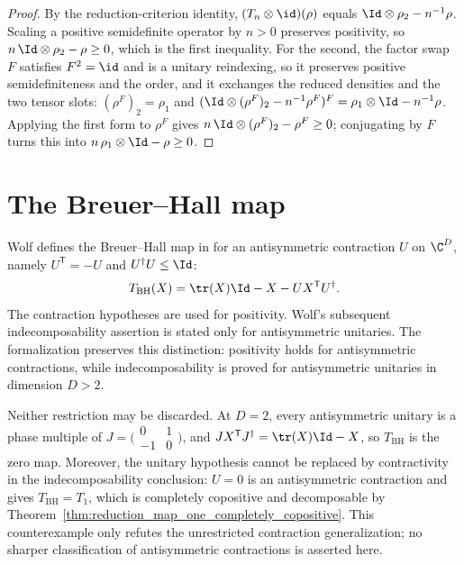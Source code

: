 \begin{proof}
    \leanok
    By the reduction-criterion identity, $(T_n\otimes\id)(\rho)$ equals
    $\Id\otimes\rho_2-n^{-1}\rho$. Scaling a positive semidefinite operator by
    $n>0$ preserves positivity, so $n\,\Id\otimes\rho_2-\rho\ge0$, which is the
    first inequality. For the second, the factor swap $F$ satisfies $F^2=\id$
    and is a unitary reindexing, so it preserves positive semidefiniteness and
    the order, and it exchanges the reduced densities and the two tensor slots:
    $(\rho^{F})_2=\rho_1$ and
    $(\Id\otimes(\rho^{F})_2-n^{-1}\rho^{F})^{F}
        =\rho_1\otimes\Id-n^{-1}\rho$.
    Applying the first form to $\rho^{F}$ gives
    $n\,\Id\otimes(\rho^{F})_2-\rho^{F}\ge0$; conjugating by $F$ turns this into
    $n\,\rho_1\otimes\Id-\rho\ge0$.
\end{proof}

\section{The Breuer--Hall map}

Wolf defines the Breuer--Hall map in
\cite[Chapter~3, Example~3.1]{Wolf2012Quantum} for an antisymmetric contraction
$U$ on $\C^{D}$, namely $U^{\mathsf T}=-U$ and
$U^{\dagger}U\le\Id$:
\begin{align}
    T_{\mathrm{BH}}(X)=\tr(X)\Id-X-U X^{\mathsf T}U^{\dagger}.
    \notag
\end{align}
The contraction hypotheses are used for positivity. Wolf's subsequent
indecomposability assertion is stated only for antisymmetric unitaries. The
formalization preserves this distinction: positivity holds for antisymmetric
contractions, while indecomposability is proved for antisymmetric unitaries in
dimension $D>2$.

Neither restriction may be discarded. At $D=2$, every antisymmetric unitary is
a phase multiple of
$J=\bigl(\begin{smallmatrix}0&1\\-1&0\end{smallmatrix}\bigr)$, and
$JX^{\mathsf T}J^{\dagger}=\tr(X)\Id-X$, so $T_{\mathrm{BH}}$ is the zero map.
Moreover, the unitary hypothesis cannot be replaced by contractivity in the
indecomposability conclusion: $U=0$ is an antisymmetric contraction and gives
$T_{\mathrm{BH}}=T_1$, which is completely copositive and decomposable by
Theorem~\ref{thm:reduction_map_one_completely_copositive}. This counterexample
only refutes the unrestricted contraction generalization; no sharper
classification of antisymmetric contractions is asserted here.

